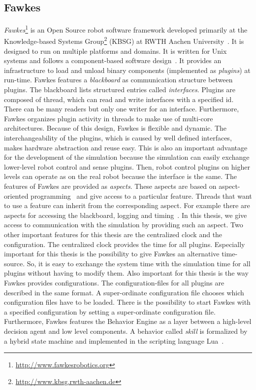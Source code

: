 \subsection{Fawkes}
\textit{Fawkes}\footnote{\url{http://www.fawkesrobotics.org}} is an Open Source robot software framework developed primarily at the Knowledge-based Systems Group\footnote{\url{http://www.kbsg.rwth-aachen.de}} (KBSG) at RWTH Aachen University~\cite{FawkesDesign}. It is designed to run on multiple platforms and domains. It is written for Unix systems and follows a component-based software design~\cite{component}. It provides an infrastructure to load and unload binary components (implemented as \textit{plugins}) at run-time. Fawkes features a \textit{blackboard} as communication structure between plugins. The blackboard lists structured entries called \textit{interfaces}. Plugins are composed of thread, which can read and write interfaces with a specified id. There can be many readers but only one writer for an interface. Furthermore, Fawkes organizes plugin activity in threads to make use of multi-core architectures. Because of this design, Fawkes is flexible and dynamic. The interchangeability of the plugins, which is caused by well defined interfaces, makes hardware abstraction and reuse easy. This is also an important advantage for the development of the simulation because the simulation can easily exchange lower-level robot control and sense plugins. Then, robot control plugins on higher levels can operate as on the real robot because the interface is the same. The features of Fawkes are provided as \textit{aspects}. These aspects are based on aspect-oriented programming~\cite{aspect_oriented} and give access to a particular feature. Threads that want to use a feature can inherit from the corresponding aspect. For example there are aspects for accessing the blackboard, logging and timing~\cite{tnthesis}. In this thesis, we give access to communication with the simulation by providing such an aspect. Two other important features for this thesis are the centralized clock and the configuration. The centralized clock provides the time for all plugins. Especially important for this thesis is the possibility to give Fawkes an alternative time-source. So, it is easy to exchange the system time with the simulation time for all plugins without having to modify them. Also important for this thesis is the way Fawkes provides configurations. The configuration-files for all plugins are described in the same format. A super-ordinate configuration file chooses which configuration files have to be loaded. There is the possibility to start Fawkes with a specified configuration by setting a super-ordinate configuration file. Furthermore, Fawkes features the Behavior Engine as a layer between a high-level decision agent and low level components. A behavior called \textit{skill} is formalized by a hybrid state machine and implemented in the scripting language Lua~\cite{behavior_engine}.\\
